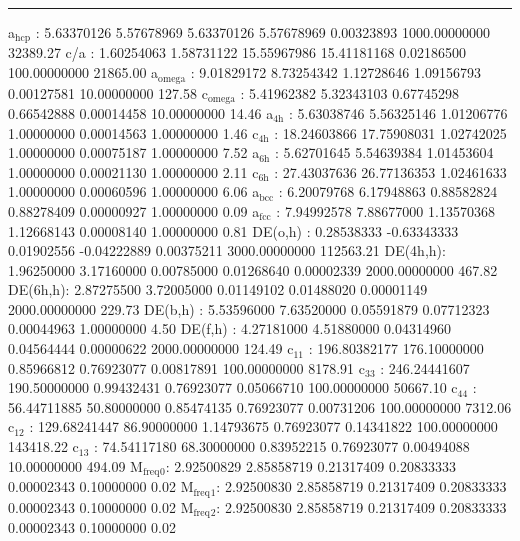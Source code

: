 \documentclass[11pt]{article}
\begin{document}
\noindent\rule{\textwidth}{0.5pt}
a\(_{\text{hcp}}\)   :   5.63370126   5.57678969   5.63370126   5.57678969   0.00323893 1000.00000000     32389.27
c/a     :   1.60254063   1.58731122  15.55967986  15.41181168   0.02186500 100.00000000     21865.00
a\(_{\text{omega}}\) :   9.01829172   8.73254342   1.12728646   1.09156793   0.00127581  10.00000000       127.58
c\(_{\text{omega}}\) :   5.41962382   5.32343103   0.67745298   0.66542888   0.00014458  10.00000000        14.46
a\(_{\text{4h}}\)    :   5.63038746   5.56325146   1.01206776   1.00000000   0.00014563   1.00000000         1.46
c\(_{\text{4h}}\)    :  18.24603866  17.75908031   1.02742025   1.00000000   0.00075187   1.00000000         7.52
a\(_{\text{6h}}\)    :   5.62701645   5.54639384   1.01453604   1.00000000   0.00021130   1.00000000         2.11
c\(_{\text{6h}}\)    :  27.43037636  26.77136353   1.02461633   1.00000000   0.00060596   1.00000000         6.06
a\(_{\text{bcc}}\)   :   6.20079768   6.17948863   0.88582824   0.88278409   0.00000927   1.00000000         0.09
a\(_{\text{fcc}}\)   :   7.94992578   7.88677000   1.13570368   1.12668143   0.00008140   1.00000000         0.81
DE(o,h) :   0.28538333  -0.63343333   0.01902556  -0.04222889   0.00375211 3000.00000000    112563.21
DE(4h,h):   1.96250000   3.17160000   0.00785000   0.01268640   0.00002339 2000.00000000       467.82
DE(6h,h):   2.87275500   3.72005000   0.01149102   0.01488020   0.00001149 2000.00000000       229.73
DE(b,h) :   5.53596000   7.63520000   0.05591879   0.07712323   0.00044963   1.00000000         4.50
DE(f,h) :   4.27181000   4.51880000   0.04314960   0.04564444   0.00000622 2000.00000000       124.49
c\(_{\text{11}}\)    : 196.80382177 176.10000000   0.85966812   0.76923077   0.00817891 100.00000000      8178.91
c\(_{\text{33}}\)    : 246.24441607 190.50000000   0.99432431   0.76923077   0.05066710 100.00000000     50667.10
c\(_{\text{44}}\)    :  56.44711885  50.80000000   0.85474135   0.76923077   0.00731206 100.00000000      7312.06
c\(_{\text{12}}\)    : 129.68241447  86.90000000   1.14793675   0.76923077   0.14341822 100.00000000    143418.22
c\(_{\text{13}}\)    :  74.54117180  68.30000000   0.83952215   0.76923077   0.00494088  10.00000000       494.09
M\(_{\text{freq}}\)\(_{\text{0}}\):   2.92500829   2.85858719   0.21317409   0.20833333   0.00002343   0.10000000         0.02
M\(_{\text{freq}}\)\(_{\text{1}}\):   2.92500830   2.85858719   0.21317409   0.20833333   0.00002343   0.10000000         0.02
M\(_{\text{freq}}\)\(_{\text{2}}\):   2.92500830   2.85858719   0.21317409   0.20833333   0.00002343   0.10000000         0.02
\end{document}
